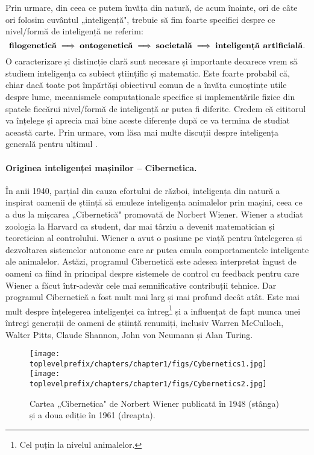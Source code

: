 \documentclass[../../book-main_ro.tex]{subfiles}
\begin{document}
Prin urmare, din ceea ce putem învăța din natură, de acum înainte, ori de câte ori folosim cuvântul „inteligență", trebuie să fim foarte specifici despre ce nivel/formă de inteligență ne referim:
\begin{equation}
\mbox{\textbf{filogenetică}} \;
   \Longrightarrow \; \mbox{\textbf{ontogenetică}} \; \Longrightarrow \;
   \mbox{\textbf{societală}}
   \; \Longrightarrow \;
   \mbox{\textbf{inteligență artificială}}.
\end{equation}
O caracterizare și distincție clară sunt necesare și importante deoarece vrem să studiem inteligența ca subiect științific și matematic. Este foarte probabil că, chiar dacă toate pot împărtăși obiectivul comun de a învăța cunoștințe utile despre lume, mecanismele computaționale specifice și implementările fizice din spatele fiecărui nivel/formă de inteligență ar putea fi diferite. Credem că cititorul va înțelege și aprecia mai bine aceste diferențe după ce va termina de studiat această carte. Prin urmare, vom lăsa mai multe discuții despre inteligența generală pentru ultimul .




\paragraph{Originea inteligenței mașinilor -- Cibernetica.}
În anii 1940, parțial din cauza efortului de război, inteligența din natură a inspirat oamenii de știință să emuleze inteligența animalelor prin mașini, ceea ce a dus la mișcarea „Cibernetică" promovată de Norbert Wiener. Wiener a studiat zoologia la Harvard ca student, dar mai târziu a devenit matematician și teoretician al controlului. Wiener a avut o pasiune pe viață pentru înțelegerea și dezvoltarea sistemelor autonome care ar putea emula comportamentele inteligente ale animalelor. Astăzi, programul Cibernetică este adesea interpretat îngust de oameni ca fiind în principal despre sistemele de control cu feedback pentru care Wiener a făcut într-adevăr cele mai semnificative contribuții tehnice. Dar programul Cibernetică a fost mult mai larg și mai profund decât atât. Este mai mult despre înțelegerea inteligenței ca întreg\footnote{Cel puțin la nivelul animalelor.} și a influențat de fapt munca unei întregi generații de oameni de știință renumiți, inclusiv Warren McCulloch, Walter Pitts, Claude Shannon, John von Neumann și Alan Turing.

\begin{figure}
    \centering
    \texttt{[image: \\toplevelprefix/chapters/chapter1/figs/Cybernetics1.jpg]}
    \hspace{10mm} \texttt{[image: \\toplevelprefix/chapters/chapter1/figs/Cybernetics2.jpg]}
    \caption{Cartea „Cibernetica" de Norbert Wiener publicată în 1948 \cite{Wiener-Cybernetics-1948} (stânga) și a doua ediție în 1961 \cite{Wiener-Cybernetics-1961} (dreapta).}
    \label{fig:cybernetcis}
\end{figure}
\end{document}
